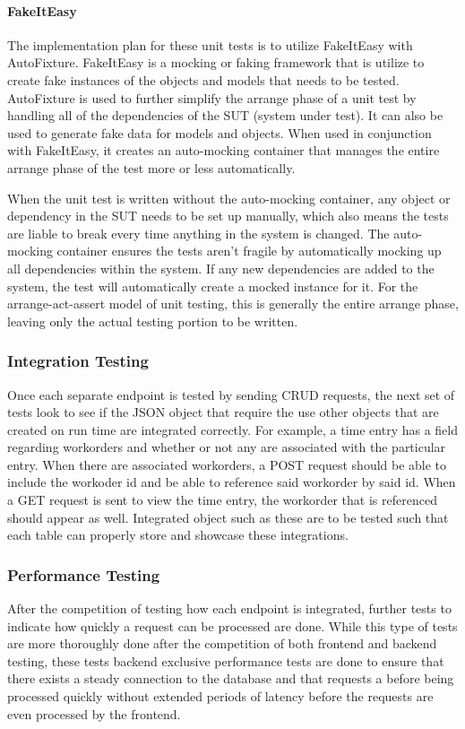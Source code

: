 {{{{{{\paragraph{FakeItEasy}
The implementation plan for these unit tests is to utilize FakeItEasy with AutoFixture. FakeItEasy is a mocking or faking framework that is utilize to create fake instances of the objects and models that needs to be tested. AutoFixture is used to further simplify the arrange phase of a unit test by handling all of the dependencies of the SUT (system under test). It can also be used to generate fake data for models and objects. When used in conjunction with FakeItEasy, it creates an auto-mocking container that manages the entire arrange phase of the test more or less automatically.
\newline
{\setlength{\parindent}{0cm}

When the unit test is written without the auto-mocking container, any object or dependency in the SUT needs to be set up manually, which also means the tests are liable to break every time anything in the system is changed. The auto-mocking container ensures the tests aren’t fragile by automatically mocking up all dependencies within the system. If any new dependencies are added to the system, the test will automatically create a mocked instance for it. For the arrange-act-assert model of unit testing, this is generally the entire arrange phase, leaving only the actual testing portion to be written.


\subsubsection{Integration Testing}
Once each separate endpoint is tested by sending CRUD requests, the next set of tests look to see if the JSON object that require the use other objects that are created on run time are integrated correctly. For example, a time entry has a field regarding workorders and whether or not any are associated with the particular entry. When there are associated workorders, a POST request should be able to include the workoder id and be able to reference said workorder by said id. When a GET request is sent to view the time entry, the workorder that is referenced should appear as well. Integrated object such as these are to be tested such that each table can properly store and showcase these integrations. 

\subsubsection{Performance Testing}
After the competition of testing how each endpoint is integrated, further tests to indicate how quickly a request can be processed are done. While this type of tests are more thoroughly done after the competition of both frontend and backend testing, these tests backend exclusive performance tests are done to ensure that there exists a steady connection to the database and that requests a before being processed quickly without extended periods of latency before the requests are even processed by the frontend. 
\newpage

}}}}}}}
